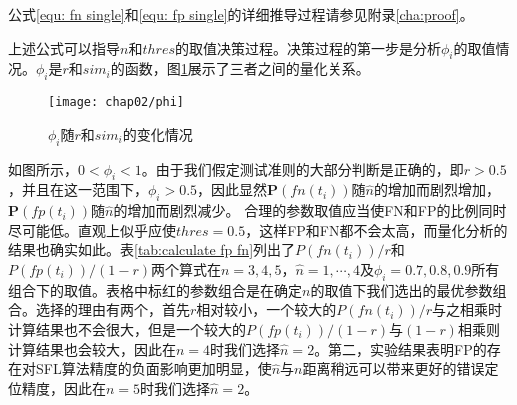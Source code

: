 公式\ref{equ: fn single}和\ref{equ: fp single}的详细推导过程请参见附录\ref{cha:proof}。

上述公式可以指导$n$和$thres$的取值决策过程。决策过程的第一步是分析$\phi_i$的取值情况。$\phi_i$是$r$和$sim_i$的函数，图\ref{fig:phi}展示了三者之间的量化关系。
\begin{figure}
	\centering
	\texttt{[image: chap02/phi]}
	\caption{$\phi_i$随$r$和${sim}_i$的变化情况}
	\label{fig:phi}
\end{figure}
如图所示，$0 < \phi_i < 1$。由于我们假定测试准则的大部分判断是正确的，即$r > 0.5$，并且在这一范围下，$\phi_i > 0.5$，因此显然$\mathbf{P}(fn(t_i))$随$\hat{n}$的增加而剧烈增加，$\mathbf{P}(fp(t_i))$随$\hat{n}$的增加而剧烈减少。
合理的参数取值应当使FN和FP的比例同时尽可能低。直观上似乎应使$thres = 0.5$，这样FP和FN都不会太高，而量化分析的结果也确实如此。表\ref{tab:calculate fp fn}列出了$P(fn(t_i))/r$和$P(fp(t_i))/(1 - r)$两个算式在$n = 3, 4, 5$，$\hat{n} = 1,\cdots, 4$及$\phi_i = 0.7, 0.8, 0.9$所有组合下的取值。表格中标红的参数组合是在确定$n$的取值下我们选出的最优参数组合。选择的理由有两个，首先$r$相对较小，一个较大的$P(fn(t_i))/r$与之相乘时计算结果也不会很大，但是一个较大的$P(fp(t_i))/(1 - r)$与$(1-r)$相乘则计算结果也会较大，因此在$n = 4$时我们选择$\hat{n} = 2$。第二，实验结果表明FP的存在对SFL算法精度的负面影响更加明显，使$\hat{n}$与$n$距离稍远可以带来更好的错误定位精度，因此在$n = 5$时我们选择$\hat{n} = 2$。
